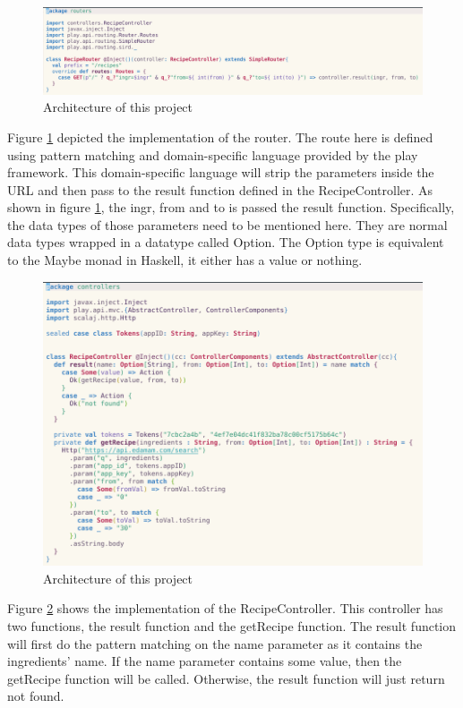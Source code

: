 \documentclass{article}
\begin{document}
\begin{normalsize}
  \begin{figure}[H]
    \centeringng
    \centerline{\includegraphics[scale=0.6]{router}}
    \caption{Architecture of this project}
    \label{fig:router}
  \end{figure}
  Figure \ref{fig:router} depicted the implementation of the router. The route here is defined using pattern matching and domain-specific language provided by the play framework. This domain-specific language will strip the parameters
  inside the URL and then pass to the result function defined in the
  RecipeController. As shown in figure \ref{fig:router}, the ingr, from and to is passed the result function. Specifically, the data types of those parameters need to be mentioned here. They are normal data types wrapped in a
  datatype called Option. The Option type is equivalent to the Maybe monad in
  Haskell, it either has a value or nothing.
  

  \begin{figure}[H]
    \centeringng
    \centerline{\includegraphics[scale=0.7]{controller}}
    \caption{Architecture of this project}
    \label{fig:controller}
  \end{figure}
  Figure \ref{fig:controller} shows the implementation of the RecipeController.
  This controller has two functions, the result function and the getRecipe
  function. The result function will first do the pattern matching on the name parameter as it contains the ingredients' name. If the name parameter contains some value, then the getRecipe function will be called. Otherwise, the result function will just return not found.


\end{normalsize}
\end{document}
